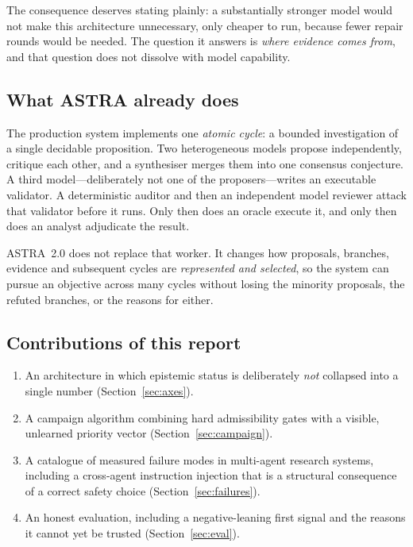 \documentclass[11pt,a4paper]{article}
\begin{document}
The consequence deserves stating plainly: a substantially stronger model would
not make this architecture unnecessary, only cheaper to run, because fewer
repair rounds would be needed. The question it answers is \emph{where evidence
comes from}, and that question does not dissolve with model capability.

\subsection{What ASTRA already does}

The production system implements one \emph{atomic cycle}: a bounded
investigation of a single decidable proposition. Two heterogeneous models
propose independently, critique each other, and a synthesiser merges them into
one consensus conjecture. A third model---deliberately not one of the
proposers---writes an executable validator. A deterministic auditor and then an
independent model reviewer attack that validator before it runs. Only then does
an oracle execute it, and only then does an analyst adjudicate the result.

ASTRA~2.0 does not replace that worker. It changes how proposals, branches,
evidence and subsequent cycles are \emph{represented and selected}, so the
system can pursue an objective across many cycles without losing the minority
proposals, the refuted branches, or the reasons for either.

\subsection{Contributions of this report}

\begin{enumerate}[leftmargin=*,itemsep=1pt]
  \item An architecture in which epistemic status is deliberately
        \emph{not} collapsed into a single number (Section~\ref{sec:axes}).
  \item A campaign algorithm combining hard admissibility gates with a visible,
        unlearned priority vector (Section~\ref{sec:campaign}).
  \item A catalogue of measured failure modes in multi-agent research systems,
        including a cross-agent instruction injection that is a structural
        consequence of a correct safety choice (Section~\ref{sec:failures}).
  \item An honest evaluation, including a negative-leaning first signal and the
        reasons it cannot yet be trusted (Section~\ref{sec:eval}).
\end{enumerate}
\end{document}

